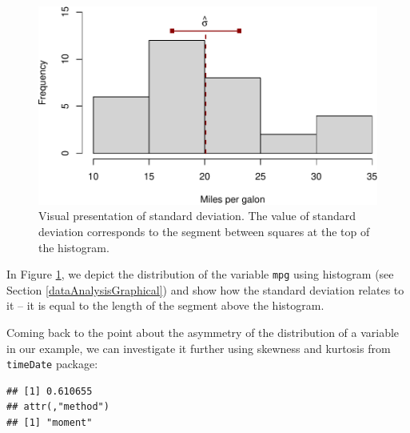\documentclass[
]{book}
\newenvironment{Shaded}{\begin{snugshade}}{\end{snugshade}}
\newcommand{\FunctionTok}[1]{\textcolor[rgb]{0.13,0.29,0.53}{\textbf{#1}}}
\newcommand{\NormalTok}[1]{#1}
\newcommand{\SpecialCharTok}[1]{\textcolor[rgb]{0.81,0.36,0.00}{\textbf{#1}}}
\theoremstyle{definition}
\theoremstyle{definition}
\theoremstyle{definition}
\theoremstyle{definition}
\theoremstyle{remark}
\begin{document}
\begin{figure}
\centering
\includegraphics{Svetunkov---Statistics-for-Business-Analytics_files/figure-latex/varianceVisual-1.pdf}
\caption{\label{fig:varianceVisual}Visual presentation of standard deviation. The value of standard deviation corresponds to the segment between squares at the top of the histogram.}
\end{figure}

In Figure \ref{fig:varianceVisual}, we depict the distribution of the variable \texttt{mpg} using histogram (see Section \ref{dataAnalysisGraphical}) and show how the standard deviation relates to it -- it is equal to the length of the segment above the histogram.

Coming back to the point about the asymmetry of the distribution of a variable in our example, we can investigate it further using skewness and kurtosis from \texttt{timeDate} package:

\begin{Shaded}
\end{Shaded}

\begin{verbatim}
## [1] 0.610655
## attr(,"method")
## [1] "moment"
\end{verbatim}

\begin{Shaded}
\end{Shaded}
\end{document}
